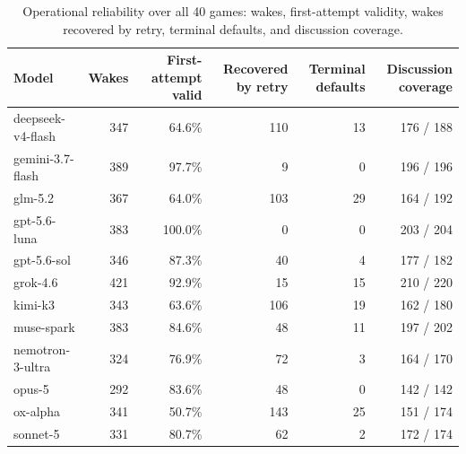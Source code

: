 \documentclass[11pt]{article}
\begin{document}
\begin{table}[H]
\centering\scriptsize
\caption{Operational reliability over all 40 games: wakes, first-attempt validity, wakes recovered by retry, terminal defaults, and discussion coverage.}
\begin{tabular}{@{}lrrrrr@{}}
\toprule
Model & Wakes & First-attempt valid & Recovered by retry & Terminal defaults & Discussion coverage \\
\midrule
deepseek-v4-flash & 347 & 64.6\% & 110 & 13 & 176 / 188 \\
gemini-3.7-flash & 389 & 97.7\% & 9 & 0 & 196 / 196 \\
glm-5.2 & 367 & 64.0\% & 103 & 29 & 164 / 192 \\
gpt-5.6-luna & 383 & 100.0\% & 0 & 0 & 203 / 204 \\
gpt-5.6-sol & 346 & 87.3\% & 40 & 4 & 177 / 182 \\
grok-4.6 & 421 & 92.9\% & 15 & 15 & 210 / 220 \\
kimi-k3 & 343 & 63.6\% & 106 & 19 & 162 / 180 \\
muse-spark & 383 & 84.6\% & 48 & 11 & 197 / 202 \\
nemotron-3-ultra & 324 & 76.9\% & 72 & 3 & 164 / 170 \\
opus-5 & 292 & 83.6\% & 48 & 0 & 142 / 142 \\
ox-alpha & 341 & 50.7\% & 143 & 25 & 151 / 174 \\
sonnet-5 & 331 & 80.7\% & 62 & 2 & 172 / 174 \\
\bottomrule
\end{tabular}
\end{table}
\end{document}
